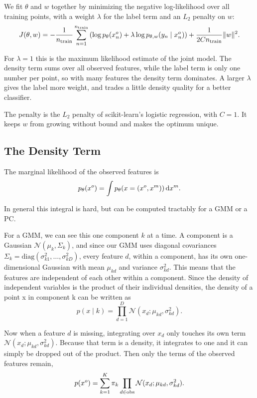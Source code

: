 We fit $\theta$ and $w$ together by minimizing the negative log-likelihood over all training points, with a weight $\lambda$ for the label term
and an $L_2$ penalty on $w$:
\begin{equation}
  J(\theta, w) = -\frac{1}{n_\mathrm{train}} \sum_{n=1}^{n_\mathrm{train}} \left( \log p_\theta(x^o_n) + \lambda \log p_{\theta, w}(y_n \mid x^o_n) \right) + \frac{1}{2 C n_\mathrm{train}} \lVert w \rVert^2 .
  \label{eq:pclr}
\end{equation}

For $\lambda = 1$ this is the maximum likelihood estimate of the joint model. The density term sums over all observed features, while the label
term is only one number per point, so with many features the density term dominates. A larger $\lambda$ gives the label more weight, and
trades a little density quality for a better classifier.

The penalty is the $L_2$ penalty of scikit-learn's logistic regression, with $C = 1$.
It keeps $w$ from growing without bound and makes the optimum unique.

\subsection{The Density Term}

The marginal likelihood of the observed features is
\[
  p_\theta(x^o) = \int p_\theta( x = (x^o, x^m)) \, \mathrm{d}x^m.
\]

In general this integral is hard, but can be computed tractably for a GMM or a PC.

For a GMM, we can see this one component $k$ at a time. A component is a
Gaussian $\mathcal{N}(\mu_k, \Sigma_k)$, and since our GMM uses diagonal covariances
$\Sigma_k = \mathrm{diag}(\sigma_{k1}^2, \dots, \sigma_{kD}^2)$,
every feature $d$, within a component, has its own one-dimensional Gaussian with
mean $\mu_{kd}$ and variance $\sigma_{kd}^2$. This means that the features are independent of each other
within a component. Since the density of independent variables is the product of their individual densities,
the density of a point x in component k can be written as
\[
  p(x \mid k) = \prod_{d=1}^{D} \mathcal{N}(x_d; \mu_{kd}, \sigma_{kd}^2).
\]

Now when a feature $d$ is missing, integrating over $x_d$ only touches its own
term $\mathcal{N}(x_d; \mu_{kd}, \sigma_{kd}^2)$.
Because that term is a density, it integrates to one and it can simply be dropped out of the product.
Then only the terms of the observed features remain,
\[
  p(x^o) = \sum_{k=1}^{K} \pi_k \prod_{d \in \mathrm{obs}} \mathcal{N}(x_d; \mu_{kd}, \sigma_{kd}^2).
\]

